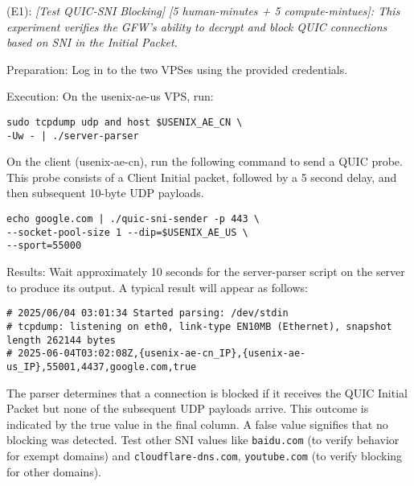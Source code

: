 \begin{compactdesc}

    \item[(E1):] \textit{[Test QUIC-SNI Blocking] [5 human-minutes + 5 compute-mintues]:
    This experiment verifies the GFW's ability to decrypt and block QUIC connections based on SNI in the Initial Packet.}

    \begin{asparadesc}

        \item[Preparation:] Log in to the two VPSes using the provided credentials.
        

\item[Execution:] On the usenix-ae-us VPS, run:
\begin{verbatim}
sudo tcpdump udp and host $USENIX_AE_CN \
-Uw - | ./server-parser
\end{verbatim}
On the client (usenix-ae-cn), run the following command to send a QUIC probe. 
This probe consists of a Client Initial packet, followed by a 5 second delay, and then subsequent 10-byte UDP payloads.
\begin{verbatim}
echo google.com | ./quic-sni-sender -p 443 \
--socket-pool-size 1 --dip=$USENIX_AE_US \
--sport=55000
\end{verbatim}
\vspace{3pt}
\item[Results:] Wait approximately 10 seconds for the server-parser script on the server to produce its output. A typical result will appear as follows:
\vspace{3pt}
\begin{tiny}
\begin{verbatim}
# 2025/06/04 03:01:34 Started parsing: /dev/stdin
# tcpdump: listening on eth0, link-type EN10MB (Ethernet), snapshot length 262144 bytes
# 2025-06-04T03:02:08Z,{usenix-ae-cn_IP},{usenix-ae-us_IP},55001,4437,google.com,true
\end{verbatim}
\end{tiny}
The parser determines that a connection is blocked if it receives the QUIC Initial Packet but none
of the subsequent UDP payloads arrive. This outcome is indicated by the true value in the final column. 
A false value signifies that no blocking was detected.
Test other SNI values like \texttt{baidu.com} (to verify behavior for exempt domains) and
\texttt{cloudflare-dns.com}, \texttt{youtube.com} (to verify blocking for other domains).


\end{asparadesc}
\end{compactdesc}
